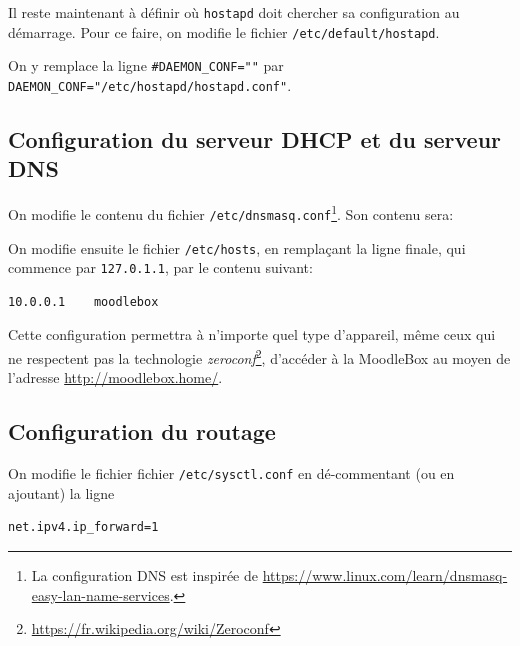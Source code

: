 \documentclass[11pt]{article}
\begin{document}
Il reste maintenant à définir où \lstinline{hostapd} doit chercher sa configuration au démarrage. Pour ce faire, on modifie le fichier \lstinline{/etc/default/hostapd}.

On y remplace la ligne \lstinline{#DAEMON_CONF=""} par \lstinline{DAEMON_CONF="/etc/hostapd/hostapd.conf"}.

\subsection{Configuration du serveur DHCP et du serveur DNS}

On modifie le contenu du fichier \lstinline{/etc/dnsmasq.conf}\footnote{La configuration DNS est inspirée de \url{https://www.linux.com/learn/dnsmasq-easy-lan-name-services}.}. Son contenu sera:



On modifie ensuite le fichier \lstinline{/etc/hosts}, en remplaçant la ligne finale, qui commence par \lstinline{127.0.1.1}, par le contenu suivant:
\begin{lstlisting}[language=bash]
10.0.0.1	moodlebox
\end{lstlisting}
Cette configuration permettra à n'importe quel type d'appareil, même ceux qui ne respectent pas la technologie \emph{zeroconf}\footnote{\url{https://fr.wikipedia.org/wiki/Zeroconf}}, d'accéder à la MoodleBox au moyen de l'adresse \url{http://moodlebox.home/}.

\subsection{Configuration du routage}

On modifie le fichier fichier \lstinline{/etc/sysctl.conf}
en dé-commentant (ou en ajoutant) la ligne
\begin{lstlisting}[language=bash]
net.ipv4.ip_forward=1
\end{lstlisting}
\end{document}
